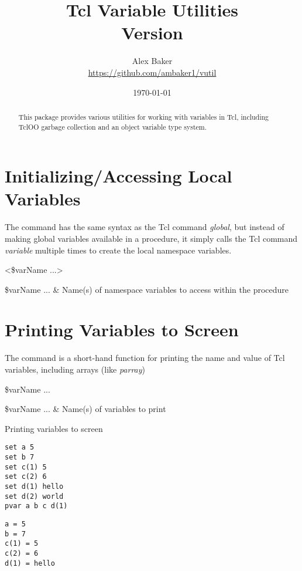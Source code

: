 \documentclass{article}
\title{\Huge Tcl Variable Utilities\\\small Version \version}
\author{Alex Baker\\\small\url{https://github.com/ambaker1/vutil}}
\date{\small\today}
\renewcommand{\^}[1]{\textsuperscript{#1}}
\renewcommand{\_}[1]{\textsubscript{#1}}
\begin{document}
\maketitle
\begin{abstract}
\begin{center}
This package provides various utilities for working with variables in Tcl, including TclOO garbage collection and an object variable type system.
\end{center}
\end{abstract}
\clearpage

\section{Initializing/Accessing Local Variables}
The command  has the same syntax as the Tcl command \textit{global}, but instead of making global variables available in a procedure, it simply calls the Tcl command \textit{variable} multiple times to create the local namespace variables.
\begin{syntax}
 <\$varName ...>
\end{syntax} 
\begin{args}
\$varName ... & Name(s) of namespace variables to access within the procedure
\end{args}

\section{Printing Variables to Screen} 
The  command is a short-hand function for printing the name and value of Tcl variables, including arrays (like \textit{parray})
\begin{syntax}
 \$varName ...
\end{syntax}
\begin{args}
\$varName ... & Name(s) of variables to print
\end{args}
\begin{example}{Printing variables to screen}
\begin{lstlisting}
set a 5
set b 7
set c(1) 5
set c(2) 6
set d(1) hello
set d(2) world
pvar a b c d(1)
\end{lstlisting}
\tcblower
\begin{lstlisting}
a = 5
b = 7
c(1) = 5
c(2) = 6
d(1) = hello
\end{lstlisting}
\end{example}

\clearpage
\end{document}
